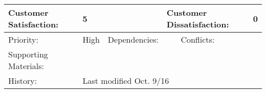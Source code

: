 \documentclass[11pt]{article}
\begin{document}
\begin{center}
\begin{tabular}{|l|l|l|l|l|l|}
Customer Satisfaction:          & \multicolumn{2}{l|}{5}                                             & \multicolumn{2}{l|}{Customer Dissatisfaction:}                 & 0                       \\ \hline
Priority:                       & High                      & Dependencies:                          &                          & Conflicts:                          &                         \\ \hline
Supporting Materials:           & \multicolumn{5}{l|}{}                                                                                                                                         \\ \hline
History:                        & \multicolumn{5}{l|}{Last modified Oct. 9/16}                                                                                                                  \\ \hline
\end{tabular}


\vspace{10 mm}


\end{center}
\end{document}
